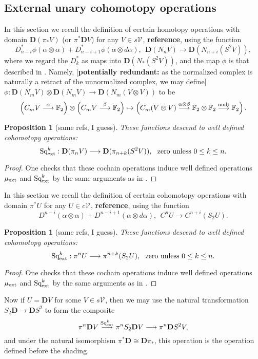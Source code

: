 \documentclass[11pt]{amsart}
\theoremstyle{plain}
\newtheorem{prop}[thm]{Proposition}
\theoremstyle{definition}
\let\oldphi\phi
\let\phi\varphi
\renewcommand{\to}{\longrightarrow}
\newcommand{\calV}{\mathcal{V}}
\theoremstyle{plain}
\newcommand{\vect}[2]{\calV^{#1}_{#2}}
\newcommand{\ExtCohOp}{\textup{Sq}_\textup{ext}}
\newcommand{\ExtCohProd}{\mu_\textup{ext}}
\newcommand{\F}{\mathbb{F}}
\newcommand{\Ftwo}{\F_2}
\newcommand{\dual}{\mathbf{D}}
\begin{document}
\begin{Constructing (co)homotopy operations}
\subsection{External unary cohomotopy operations}
In this section we recall the definition of certain homotopy operations with domain $\dual(\pi_*V)$ (or $\pi^*\dual V$) for any $V\in s\vect{}{}$, \textbf{reference}, using the function
\[D^*_{n-i}\oldphi(\alpha\otimes \alpha)+D^*_{n-i+1}\oldphi(\alpha\otimes d\alpha),\ \ \dual(N_nV) \to \dual(N_{n+i}(S^2V)),\]
where we regard the $D^*_k$ as maps into $\dual(N_*(S^2V))$, and the map $\oldphi$ is that described in \cite[\S1.9]{MR2245560}. Namely, [\textbf{potentially redundant:} as the normalized complex is naturally a retract of the unnormalized complex, we may define] $\oldphi:\dual\left(N_mV\right)\otimes \dual\left(N_mV\right)\to \dual\left(N_m(V\otimes V)\right)$ to be
\[\left(C_mV\overset{\alpha}{\to}\Ftwo \right)\otimes \left(C_mV\overset{\beta}{\to}\Ftwo \right)\mapsto\left(C_m(V\otimes V)\overset{\alpha\otimes\beta}{\to}\Ftwo \otimes \Ftwo \overset{\textup{mult}}{\to}\Ftwo \right).\]
\begin{prop}[same refs, I guess]
These functions descend to  well defined cohomotopy operations:
\[\ExtCohOp^k:\dual(\pi_{n}V)\to \dual(\pi_{n+k}(S^2V)),\text{ \ zero unless $0\leq k\leq n$.}\]
\end{prop}
\begin{proof}
One checks that these cochain operations induce well defined operations $\ExtCohProd$ and $\ExtCohOp^k$ by the same arguments as in \cite[\S1.12]{MR2245560}.
\end{proof}

\begin{shaded}
In this section we recall the definition of certain cohomotopy operations with domain $\pi^*U$ for any $U\in c\vect{}{}$, \textbf{reference}, using the function
\[D^{n-i}(\alpha\otimes \alpha)+D^{n-i+1}(\alpha\otimes d\alpha),\ \ C^nU \to C^{n+i}(S_2U).\]
\begin{prop}[same refs, I guess] 
These functions descend to  well defined cohomotopy operations:
\[\ExtCohOp^k:\pi^{n}U\to \pi^{n+k}(S_2U),\text{ \ zero unless $0\leq k\leq n$.}\]
\end{prop}
\begin{proof}
One checks that these cochain operations induce well defined operations $\ExtCohProd$ and $\ExtCohOp^k$ by the same arguments as in \cite[\S1.12]{MR2245560}.
\end{proof}
Now if $U=\dual V$ for some $V\in s\vect{}{}$, then we may use the natural transformation $S_2\dual\to\dual S^2$ to form the composite
\[\pi^n\dual V\overset{\ExtCohOp^k}{\to}\pi^nS_2\dual V\to \pi^n\dual S^2V,\]
and under the natural isomorphism $\pi^*\dual\cong \dual\pi_*$, this operation is the operation defined before the shading.


\end{shaded}
\end{Constructing (co)homotopy operations}
\end{document}
